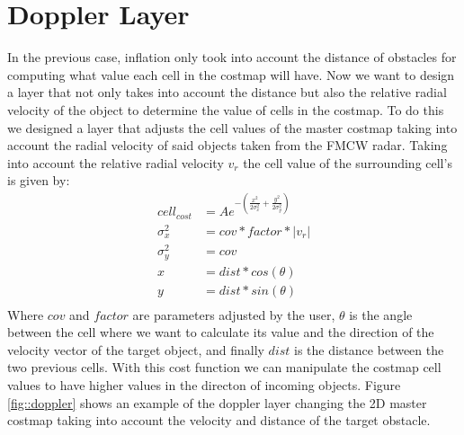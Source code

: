\section{Doppler Layer}
In the previous case, inflation only took into account the distance of obstacles for computing what value each cell in the costmap will have. Now we want to design a layer that not only takes into account the distance but also the relative radial velocity of the object to determine the value of cells in the costmap.
To do this we designed a layer that adjusts the cell values of the master costmap taking into account the radial velocity of said objects taken from the \ac{FMCW} \ac{radar}. Taking into account the relative  radial velocity $v_r$ the cell value of the surrounding cell's is given by:
\begin{equation} \label{eq1}
\begin{split}
cell_{cost} & = A e^{-(\frac{x^2}{2 \sigma_x^2}+\frac{y^2}{2 \sigma_y^2})} \\
 \sigma_x^2 & = cov * factor * |v_r| \\
 \sigma_y^2 & = cov \\
 x & =dist *cos(\theta)\\
 y & =dist *sin(\theta)\\
\end{split}
\end{equation}
Where $cov$ and $factor$ are parameters adjusted by the user, $\theta$ is the angle between the cell where we want to calculate its value and the direction of the velocity vector of the target object, and finally $dist$ is the distance between the two previous cells.
With this cost function we can manipulate the costmap cell values to have higher values in the directon of incoming objects. Figure \ref{fig::doppler} shows an example of the doppler layer changing the 2D master costmap taking into account the velocity and distance of the target obstacle. 

